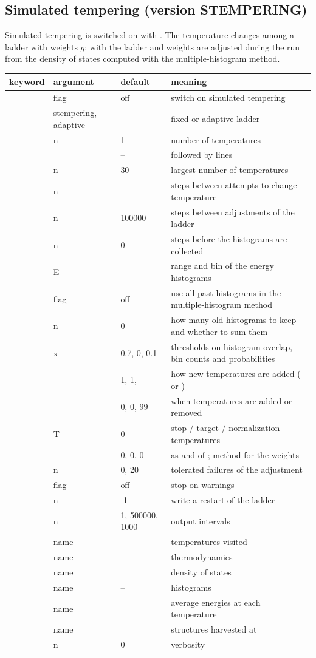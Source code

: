 \documentclass[11pt,a4paper]{article}
\newenvironment{keywords}
 {\begin{longtable}{>{\raggedright}p{0.2\textwidth}>{\raggedright}p{0.12\textwidth}>{\raggedright}p{0.14\textwidth}p{0.41\textwidth}}
  \toprule keyword & argument & default & meaning \\ \midrule \endhead
  \bottomrule \endfoot}
 {\end{longtable}}
\newcommand{\key}[4]{\kw{#1} & #2 & #3 & #4 \\}
\begin{document}
\subsection{Simulated tempering (version STEMPERING)}
Simulated tempering is switched on with . The temperature
changes among a ladder with weights $g$; with  the
ladder and weights are adjusted during the run from the density of states
computed with the multiple-histogram method.
\begin{keywords}
\key{stempering}{flag}{off}{switch on simulated tempering}
\key{st_method}{stempering, adaptive}{--}{fixed or adaptive ladder}
\key{st_ntemp}{n}{1}{number of temperatures}
\key{st_temperatures}{}{--}{followed by \kw{st_ntemp} lines \kw{T [g]}}
\key{st_ntmax}{n}{30}{largest number of temperatures}
\key{st_nstep}{n}{--}{steps between attempts to change temperature}
\key{st_nsadj}{n}{100000}{steps between adjustments of the ladder}
\key{st_preamble}{n}{0}{steps before the histograms are collected}
\key{st_emin, st_emax, st_ebin}{E}{--}{range and bin of the energy histograms}
\key{st_keepall}{flag}{off}{use all past histograms in the multiple-histogram method}
\key{st_nkeepold, st_sumoldhisto}{n}{0}{how many old histograms to keep and whether to sum them}
\key{st_hthresh, st_binthresh, st_phthresh}{x}{0.7, 0, 0.1}{thresholds on histogram overlap, bin counts and probabilities}
\key{st_k_new, st_lp_new, st_anneal}{}{1, 1, --}{how new temperatures are added (\kw{st_anneal sigma} or \kw{prob})}
\key{st_lpthresh, st_t_only_add, st_removet}{}{0, 0, 99}{when temperatures are added or removed}
\key{st_tstop, st_ttarget, st_tnorm}{T}{0}{stop / target / normalization temperatures}
\key{st_ignoreb, st_deltat, st_gmethod}{}{0, 0, 0}{as \kw{ignoreb} and \kw{deltat} of \kw{mhistogram}; method for the weights}
\key{st_nfail1, st_nfail2}{n}{0, 20}{tolerated failures of the adjustment}
\key{st_paranoid}{flag}{off}{stop on warnings}
\key{st_restart}{n}{-1}{write a restart of the ladder}
\key{st_nprint, st_nprntt, st_printpdb}{n}{1, 500000, 1000}{output intervals}
\key{st_tfile}{name}{\kw{temperatures.dat}}{temperatures visited}
\key{st_thefile}{name}{\kw{thermdodyn.dat}}{thermodynamics}
\key{st_dosfile}{name}{\kw{dos.dat}}{density of states}
\key{st_histofile}{name}{--}{histograms}
\key{st_dumbfile}{name}{\kw{dumb.dat}}{average energies at each temperature}
\key{st_pdbnf}{name}{\kw{harvest.pdb}}{structures harvested at \kw{st_ttarget}}
\key{st_debug}{n}{0}{verbosity}
\end{keywords}
\end{document}
